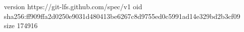 version https://git-lfs.github.com/spec/v1
oid sha256:ff909ffa2d0250e9031d480413be6267c8d9755ed0c5991ad14e329bd2b3cf09
size 174916
